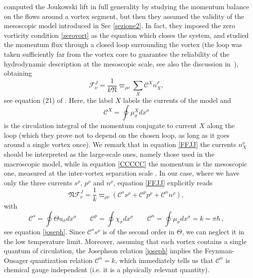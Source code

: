 \documentclass[preprints,article,accept,moreauthors,pdftex]{mdpi}
\begin{document}
\citet{Carter_Prix_Magnus} computed the  Joukowski lift in full generality by studying the momentum balance on the flows around a vortex segment, but then they assumed the validity of the mesoscopic model  introduced in Sec \ref{sezione2}. In fact, they imposed the zero vorticity condition \eqref{zerovort} as the equation which closes the system, and studied the momentum flux through a closed loop surrounding the vortex (the loop was taken sufficiently far from the vortex core to guarantee the reliability of the hydrodynamic description at the mesoscopic scale, see also the discussion in~\cite{sourie2020IJMPB}), obtaining  
\begin{equation}
\label{FFJJ}
\mathcal{F}^J_\nu =\dfrac{1}{k \mathfrak{N}} \varpi_{\rho \nu} \sum_X \mathcal{C}^X n_X^\rho,
\end{equation}
see equation (21) of \cite{Carter_Prix_Magnus}. 
Here, the label $X$ labels the currents of the model and
\begin{equation}
\label{CCCCC}
\mathcal{C}^X = \oint \mu^X_\sigma dx^\sigma
\end{equation}
is the circulation integral of the momentum conjugate to current $X$ along the loop (which they prove not to depend on the chosen loop, as long as it goes around a single vortex once). 
We remark that in equation \eqref{FFJJ} the currents $n_X^\nu$ should be interpreted as the large-scale ones, namely those used in the macroscopic model, while in equation \eqref{CCCCC} the momentum is the mesoscopic one, measured at the inter-vortex separation scale \cite{Carter_Prix_Magnus}.
In our case, where we have only the three currents $s^\rho$, $p^\rho$ and $n^\rho$, equation \eqref{FFJJ} explicitly reads 
\begin{equation}\label{paperibo}
\mathfrak{N} \mathcal{F}^J_\nu = \dfrac{1}{k} \varpi_{\rho \nu} (\mathcal{C}^s s^\rho + \mathcal{C}^p p^\rho + \mathcal{C}^n n^\rho),
\end{equation}
with
\begin{equation}\label{circolazioniIIIIIII}
\mathcal{C}^s =\oint \Theta u_\sigma dx^\sigma  \quad \quad \mathcal{C}^p = \oint \chi_\sigma dx^\sigma  \quad \quad   \mathcal{C}^n = \oint \mu_\sigma dx^\sigma  = k = \pi \hbar \, ,
\end{equation}
see equation \eqref{joseph}.
Since $\mathcal{C}^s s^\rho$ is of the second order in $\Theta$, we can neglect it in the low temperature limit. 
Moreover, assuming that each vortex contains a single quantum of circulation, the Josephson relation \eqref{joseph} implies the Feynman-Onsager quantization relation $\mathcal{C}^n=k$, which immediately tells us that $\mathcal{C}^n$ is chemical gauge independent (i.e. it is a physically relevant quantity).  
\end{document}
